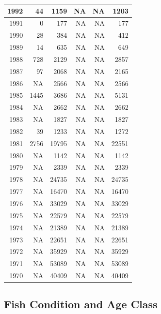 \documentclass[
]{book}
\theoremstyle{definition}
\theoremstyle{definition}
\theoremstyle{definition}
\theoremstyle{definition}
\theoremstyle{remark}
\begin{document}
\begin{table}
\begin{tabular}[t]{rrrrrr}
\hline
1992 & 44 & 1159 & NA & NA & 1203\\
\hline
1991 & 0 & 177 & NA & NA & 177\\
\hline
1990 & 28 & 384 & NA & NA & 412\\
\hline
1989 & 14 & 635 & NA & NA & 649\\
\hline
1988 & 728 & 2129 & NA & NA & 2857\\
\hline
1987 & 97 & 2068 & NA & NA & 2165\\
\hline
1986 & NA & 2566 & NA & NA & 2566\\
\hline
1985 & 1445 & 3686 & NA & NA & 5131\\
\hline
1984 & NA & 2662 & NA & NA & 2662\\
\hline
1983 & NA & 1827 & NA & NA & 1827\\
\hline
1982 & 39 & 1233 & NA & NA & 1272\\
\hline
1981 & 2756 & 19795 & NA & NA & 22551\\
\hline
1980 & NA & 1142 & NA & NA & 1142\\
\hline
1979 & NA & 2339 & NA & NA & 2339\\
\hline
1978 & NA & 24735 & NA & NA & 24735\\
\hline
1977 & NA & 16470 & NA & NA & 16470\\
\hline
1976 & NA & 33029 & NA & NA & 33029\\
\hline
1975 & NA & 22579 & NA & NA & 22579\\
\hline
1974 & NA & 21389 & NA & NA & 21389\\
\hline
1973 & NA & 22651 & NA & NA & 22651\\
\hline
1972 & NA & 35929 & NA & NA & 35929\\
\hline
1971 & NA & 53089 & NA & NA & 53089\\
\hline
1970 & NA & 40409 & NA & NA & 40409\\
\hline
\end{tabular}
\end{table}

\hypertarget{fish-condition-and-age-class}{%
\subsection{Fish Condition and Age Class}\label{fish-condition-and-age-class}}
\end{document}
